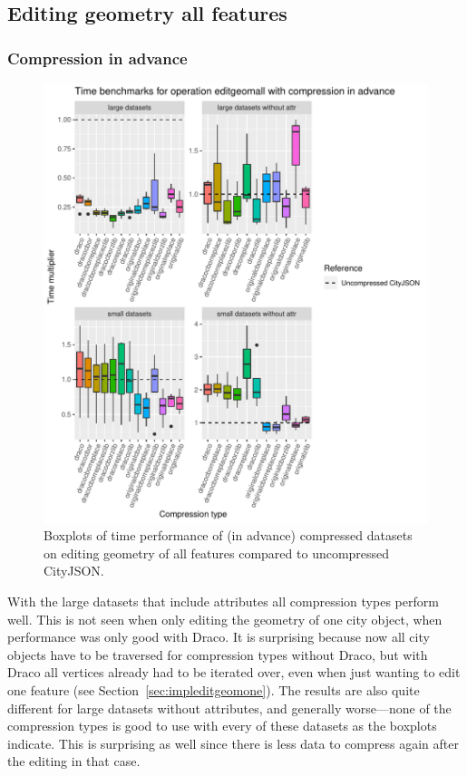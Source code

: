 \newpage

\subsection{Editing geometry all features}


\subsubsection{Compression in advance}

\begin{figure}[h!]
    \includegraphics[scale=0.92]{figs/benchmark/individual/editgeomall.pdf}
    \caption{Boxplots of time performance of (in advance) compressed datasets on editing geometry of all features compared to uncompressed CityJSON.}
    \label{fig:sdvis}
\end{figure}

With the large datasets that include attributes all compression types perform well.
This is not seen when only editing the geometry of one city object, when performance was only good with Draco.
It is surprising because now all city objects have to be traversed for compression types without Draco, but with Draco all vertices already had to be iterated over, even when just wanting to edit one feature (see Section~\ref{sec:impleditgeomone}).
The results are also quite different for large datasets without attributes, and generally worse---none of the compression types is good to use with every of these datasets as the boxplots indicate.
This is surprising as well since there is less data to compress again after the editing in that case.

